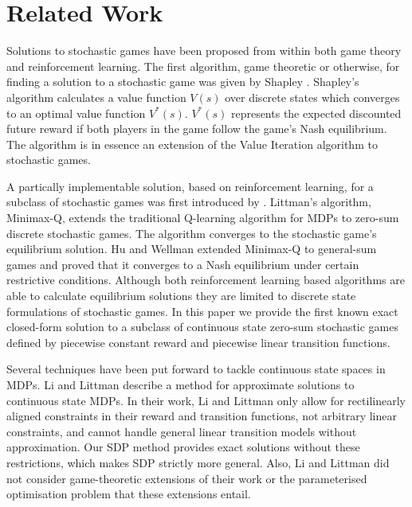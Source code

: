 \section{Related Work}
\label{sec:relatedwork}

Solutions to stochastic games have been proposed from within both
game theory and reinforcement learning. The first algorithm, game theoretic or otherwise, for 
finding a solution to a stochastic game was given by Shapley \cite{Shapley_PotNAoS_1953}.
Shapley's algorithm calculates a value function {\small $V(s)$} over discrete states
which converges to an optimal value function {\small$V^{*}(s)$}. {\small $V^{*}(s)$} represents
the expected discounted future reward if both players in the game follow
the game's Nash equilibrium. The algorithm is in essence an 
extension of the Value Iteration algorithm to stochastic games. 

A partically implementable solution, based on reinforcement learning, for a 
subclass of stochastic games was first introduced by 
\cite{Littman_ICML_1994}. Littman's algorithm, Minimax-Q,
extends the traditional Q-learning algorithm for MDPs to 
zero-sum discrete stochastic games. The algorithm converges to the 
stochastic game's equilibrium solution. Hu and Wellman \cite{Hu_ICML_1998}
extended Minimax-Q to general-sum games and proved that it converges
to a Nash equilibrium under certain restrictive conditions. Although
both reinforcement learning based algorithms are able to calculate 
equilibrium solutions they are limited to discrete state formulations of
stochastic games. In this paper we provide the first known exact closed-form 
solution to a subclass of continuous state zero-sum stochastic games defined by 
piecewise constant reward and piecewise linear transition functions.


Several techniques have been put forward to tackle continuous state
spaces in MDPs. Li and Littman \cite{Li_AAAI_2005} describe a method
for approximate solutions to continuous
state MDPs.  In their work, Li and Littman only allow for rectilinearly aligned 
constraints in their reward and transition functions, not arbitrary linear constraints,
and cannot handle general linear transition models without approximation.  
Our SDP method provides exact solutions without these restrictions, which
makes SDP strictly more general.  Also, Li and Littman did not consider 
game-theoretic extensions of their work or the parameterised optimisation 
problem that these extensions entail.

